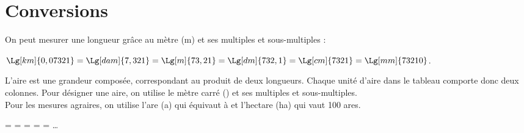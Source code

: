 \section{Conversions}

On peut mesurer une longueur grâce au mètre (m) et ses multiples et sous-multiples :

\vspace*{-8mm}

\begin{exemple*1}
   $\Lg[km]{0,07321} =\Lg[dam]{7,321} =\Lg[m]{73,21}=\Lg[dm]{732,1} =\Lg[cm]{7321} =\Lg[mm]{73210}$. 
\end{exemple*1}

\clearpage

L'aire est une grandeur composée, correspondant au produit de deux longueurs. Chaque unité d'aire dans le tableau comporte donc deux colonnes. Pour désigner une aire, on utilise le mètre carré (\Aire[m]{}) et ses multiples et sous-multiples. \\
Pour les mesures agraires, on utilise l'are (a) qui équivaut à  et l'hectare (ha) qui vaut 100 ares. \smallskip

\vspace*{-8mm}

\begin{exemple*1}
    =  =  =  =  = \dots
\end{exemple*1}